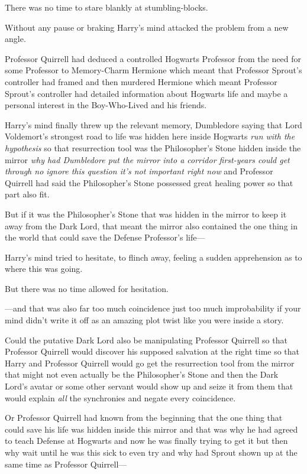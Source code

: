 There was no time to stare blankly at stumbling-blocks.

Without any pause or braking Harry's mind attacked the problem from a new angle.

Professor Quirrell had deduced a controlled Hogwarts Professor from the need for some Professor to Memory-Charm Hermione which meant that Professor Sprout's controller had framed and then murdered Hermione which meant Professor Sprout's controller had detailed information about Hogwarts life and maybe a personal interest in the Boy-Who-Lived and his friends.

Harry's mind finally threw up the relevant memory, Dumbledore saying that Lord Voldemort's strongest road to life was hidden here inside Hogwarts \emph{run with the hypothesis} so that resurrection tool was the Philosopher's Stone hidden inside the mirror \emph{why had Dumbledore put the mirror into a corridor first-years could get through no ignore this question it's not important right now} and Professor Quirrell had said the Philosopher's Stone possessed great healing power so that part also fit.

But if it was the Philosopher's Stone that was hidden in the mirror to keep it away from the Dark Lord, that meant the mirror also contained the one thing in the world that could save the Defense Professor's life—

Harry's mind tried to hesitate, to flinch away, feeling a sudden apprehension as to where this was going.

But there was no time allowed for hesitation.

—and that was also far too much coincidence just too much improbability if your mind didn't write it off as an amazing plot twist like you were inside a story.

Could the putative Dark Lord also be manipulating Professor Quirrell so that Professor Quirrell would discover his supposed salvation at the right time so that Harry and Professor Quirrell would go get the resurrection tool from the mirror that might not even actually be the Philosopher's Stone and then the Dark Lord's avatar or some other servant would show up and seize it from them that would explain \emph{all} the synchronies and negate every coincidence.

Or Professor Quirrell had known from the beginning that the one thing that could save his life was hidden inside this mirror and that was why he had agreed to teach Defense at Hogwarts and now he was finally trying to get it but then why wait until he was this sick to even try and why had Sprout shown up at the same time as Professor Quirrell—

